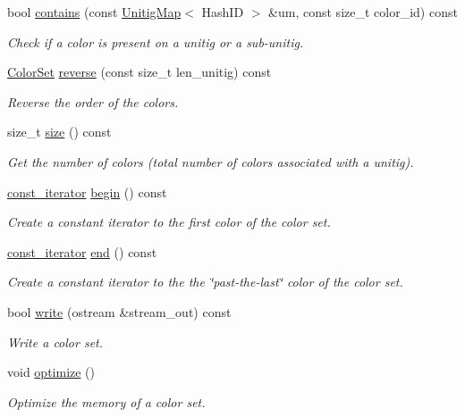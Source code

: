 \begin{DoxyCompactItemize}
bool \hyperlink{classColorSet_a192f572f4bffc3edff720045b4a8f41f}{contains} (const \hyperlink{structUnitigMap}{Unitig\+Map}$<$ Hash\+ID $>$ \&um, const size\+\_\+t color\+\_\+id) const
\begin{DoxyCompactList}\small\item\em Check if a color is present on a unitig or a sub-\/unitig. \end{DoxyCompactList}\item 
\hyperlink{classColorSet}{Color\+Set} \hyperlink{classColorSet_a706df07e45b58415b09388035f1fd035}{reverse} (const size\+\_\+t len\+\_\+unitig) const
\begin{DoxyCompactList}\small\item\em Reverse the order of the colors. \end{DoxyCompactList}\item 
size\+\_\+t \hyperlink{classColorSet_a9b987d139b85a1c53bb5a5ba4ee10a75}{size} () const
\begin{DoxyCompactList}\small\item\em Get the number of colors (total number of colors associated with a unitig). \end{DoxyCompactList}\item 
\hyperlink{classColorSet_1_1ColorSet__const__iterator}{const\+\_\+iterator} \hyperlink{classColorSet_a39bcc44bcf47c9e31a27a5b4fd4c75d8}{begin} () const
\begin{DoxyCompactList}\small\item\em Create a constant iterator to the first color of the color set. \end{DoxyCompactList}\item 
\hyperlink{classColorSet_1_1ColorSet__const__iterator}{const\+\_\+iterator} \hyperlink{classColorSet_a1cbf01ea772e3318644c95a6d95348fd}{end} () const
\begin{DoxyCompactList}\small\item\em Create a constant iterator to the the \char`\"{}past-\/the-\/last\char`\"{} color of the color set. \end{DoxyCompactList}\item 
bool \hyperlink{classColorSet_a74e1df482946158e01659d15b5b71375}{write} (ostream \&stream\+\_\+out) const
\begin{DoxyCompactList}\small\item\em Write a color set. \end{DoxyCompactList}\item 
void \hyperlink{classColorSet_a5b0ee00180757bccb3395e449b99f789}{optimize} ()
\begin{DoxyCompactList}\small\item\em Optimize the memory of a color set. \end{DoxyCompactList}\end{DoxyCompactItemize}


